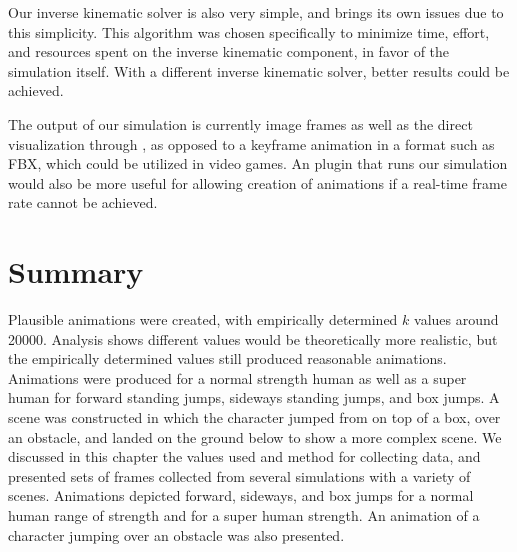 Our inverse kinematic solver is also very simple, and brings its own issues due to this simplicity.  This algorithm was chosen specifically to minimize time, effort, and resources spent on the inverse kinematic component, in favor of the simulation itself.  With a different inverse kinematic solver, better results could be achieved.

The output of our simulation is currently image frames as well as the direct visualization through \unity, as opposed to a keyframe animation in a format such as FBX, which could be utilized in video games.  An \maya  plugin that runs our simulation would also be more useful for allowing creation of animations if a real-time frame rate cannot be achieved.

\section{Summary}
\label{section:results_summary}
Plausible animations were created, with empirically determined $k$ values around 20000.  Analysis shows different values would be theoretically more realistic, but the empirically determined values still produced reasonable animations.  Animations were produced for a normal strength human as well as a super human for forward standing jumps, sideways standing jumps, and box jumps.  A scene was constructed in which the character jumped from on top of a box, over an obstacle, and landed on the ground below to show a more complex scene.  We discussed in this chapter the values used and method for collecting data, and presented sets of frames collected from several simulations with a variety of scenes.  Animations depicted forward, sideways, and box jumps for a normal human range of strength and for a super human strength.  An animation of a character jumping over an obstacle was also presented.